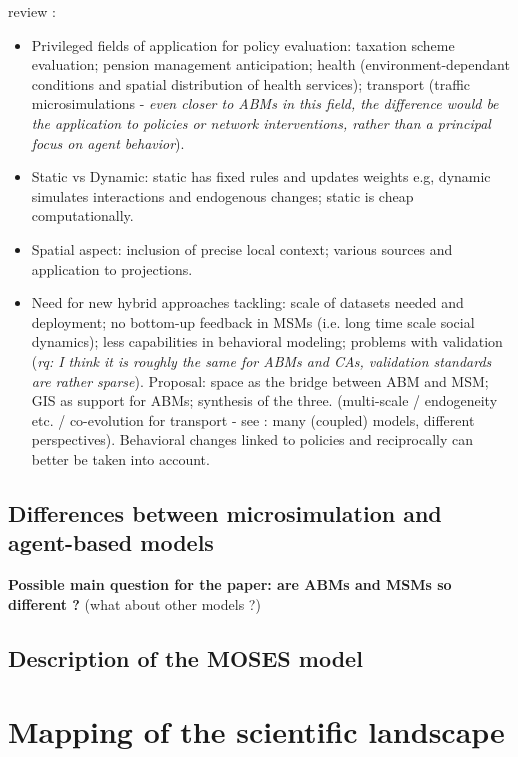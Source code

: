 \documentclass[11pt]{article}
\begin{document}
\cite{birkin2012review} review :
\begin{itemize}
    \item Privileged fields of application for policy evaluation: taxation scheme evaluation; pension management anticipation; health (environment-dependant conditions and spatial distribution of health services); transport (traffic microsimulations - \textit{even closer to ABMs in this field, the difference would be the application to policies or network interventions, rather than a principal focus on agent behavior}).
    \item Static vs Dynamic: static has fixed rules and updates weights e.g, dynamic simulates interactions and endogenous changes; static is cheap computationally.
    \item Spatial aspect: inclusion of precise local context; various sources and application to projections.
    \item Need for new hybrid approaches tackling: scale of datasets needed and deployment; no bottom-up feedback in MSMs (i.e. long time scale social dynamics); less capabilities in behavioral modeling; problems with validation (\textit{rq: I think it is roughly the same for ABMs and CAs, validation standards are rather sparse}). Proposal: space as the bridge between ABM and MSM; GIS as support for ABMs; synthesis of the three. (multi-scale / endogeneity etc. / co-evolution for transport - see \cite{batty2019causality} : many (coupled) models, different perspectives). Behavioral changes linked to policies and reciprocally can better be taken into account.
\end{itemize}


\subsection{Differences between microsimulation and agent-based models}

\textbf{Possible main question for the paper: are ABMs and MSMs so different ?} (what about other models ?)





\subsection{Description of the MOSES model}






\section{Mapping of the scientific landscape}
\end{document}
